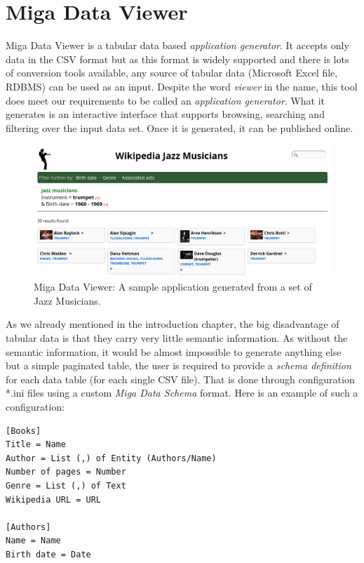 \section{Miga Data Viewer}
\label{sec:related-work:miga-data-viewer}

Miga Data Viewer is a tabular data based \emph{application generator}. It accepts only data in the CSV format but as this format is widely supported and there is lots of conversion tools available, any source of tabular data (Microsoft Excel file, RDBMS) can be used as an input. Despite the word \emph{viewer} in the name, this tool does meet our requirements to be called an \emph{application generator}. What it generates is an interactive interface that supports browsing, searching and filtering over the input data set. Once it is generated, it can be published online.

\begin{figure}
	\centering
	\includegraphics[width=140mm]{img/02_miga_data_viewer.png}
	\caption{Miga Data Viewer: A sample application generated from a set of Jazz Musicians.}
	\label{fig:miga-data-viewer}
\end{figure}

As we already mentioned in the introduction chapter, the big disadvantage of tabular data is that they carry very little semantic information. As without the semantic information, it would be almost impossible to generate anything else but a simple paginated table, the user is required to provide a \emph{schema definition} for each data table (for each single CSV file). That is done through configuration *.ini files using a custom \emph{Miga Data Schema} format. Here is an example of such a configuration:

\scriptsize
\begin{verbatim}
[Books]
Title = Name
Author = List (,) of Entity (Authors/Name)
Number of pages = Number
Genre = List (,) of Text
Wikipedia URL = URL

[Authors]
Name = Name
Birth date = Date
\end{verbatim}
\normalsize

